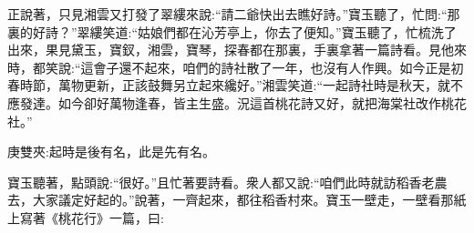 \begin{parag}
    正說著，只見湘雲又打發了翠縷來說:“請二爺快出去瞧好詩。”寶玉聽了，忙問:“那裏的好詩？”翠縷笑道:“姑娘們都在沁芳亭上，你去了便知。”寶玉聽了，忙梳洗了出來，果見黛玉，寶釵，湘雲，寶琴，探春都在那裏，手裏拿著一篇詩看。見他來時，都笑說:“這會子還不起來，咱們的詩社散了一年，也沒有人作興。如今正是初春時節，萬物更新，正該鼓舞另立起來纔好。”湘雲笑道:“一起詩社時是秋天，就不應發達。如今卻好萬物逢春，皆主生盛。況這首桃花詩又好，就把海棠社改作桃花社。”\begin{note}庚雙夾:起時是後有名，此是先有名。\end{note}寶玉聽著，點頭說:“很好。”且忙著要詩看。衆人都又說:“咱們此時就訪稻香老農去，大家議定好起的。”說著，一齊起來，都往稻香村來。寶玉一壁走，一壁看那紙上寫著《桃花行》一篇，曰:
\end{parag}


